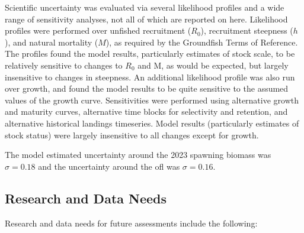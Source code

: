 \documentclass[11pt,
  letterpaper,
]{article}
\begin{document}
Scientific uncertainty was evaluated via several likelihood profiles and a wide range of sensitivity analyses, not all of which are reported on here. Likelihood profiles were performed over unfished recruitment (\(R_0\)), recruitment steepness (\(h\)), and natural mortality (\(M\)), as required by the Groundfish Terms of Reference. The profiles found the model results, particularly estimates of stock scale, to be relatively sensitive to changes to \(R_0\) and M, as would be expected, but largely insensitive to changes in steepness. An additional likelihood profile was also run over growth, and found the model results to be quite sensitive to the assumed values of the growth curve. Sensitivities were performed using alternative growth and maturity curves, alternative time blocks for selectivity and retention, and alternative historical landings timeseries. Model results (particularly estimates of stock status) were largely insensitive to all changes except for growth.

The model estimated uncertainty around the 2023 spawning biomass was \(\sigma = 0.18\) and the uncertainty around the \gls{ofl} was \(\sigma = 0.16\).

\hypertarget{research-and-data-needs-1}{%
\subsection{Research and Data Needs}\label{research-and-data-needs-1}}

Research and data needs for future assessments include the following:
\end{document}
